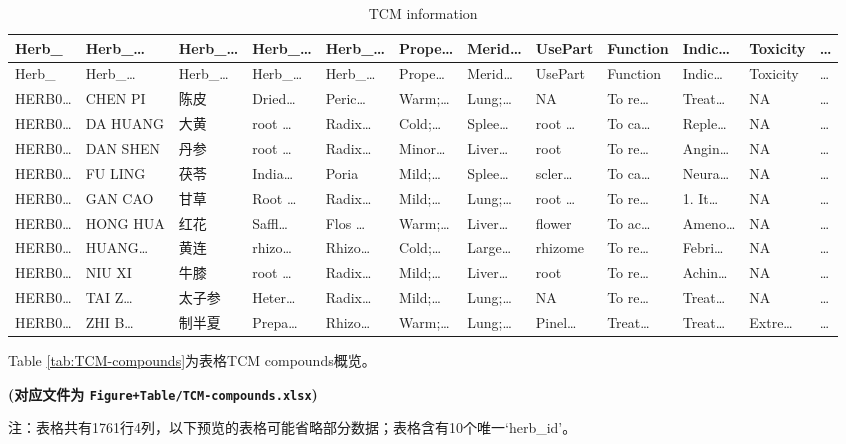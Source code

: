\documentclass[
]{article}
\begin{document}
\begin{longtable}[]{@{}llllllllllll@{}}
\caption{\label{tab:TCM-information}TCM information}\tabularnewline
\toprule
Herb\_ & Herb\_\ldots{} & Herb\_\ldots{} & Herb\_\ldots{} & Herb\_\ldots{} & Prope\ldots{} & Merid\ldots{} & UsePart & Function & Indic\ldots{} & Toxicity & \ldots{}\tabularnewline
\midrule
\endfirsthead
\toprule
Herb\_ & Herb\_\ldots{} & Herb\_\ldots{} & Herb\_\ldots{} & Herb\_\ldots{} & Prope\ldots{} & Merid\ldots{} & UsePart & Function & Indic\ldots{} & Toxicity & \ldots{}\tabularnewline
\midrule
\endhead
HERB0\ldots{} & CHEN PI & 陈皮 & Dried\ldots{} & Peric\ldots{} & Warm;\ldots{} & Lung;\ldots{} & NA & To re\ldots{} & Treat\ldots{} & NA & \ldots{}\tabularnewline
HERB0\ldots{} & DA HUANG & 大黄 & root \ldots{} & Radix\ldots{} & Cold;\ldots{} & Splee\ldots{} & root \ldots{} & To ca\ldots{} & Reple\ldots{} & NA & \ldots{}\tabularnewline
HERB0\ldots{} & DAN SHEN & 丹参 & root \ldots{} & Radix\ldots{} & Minor\ldots{} & Liver\ldots{} & root & To re\ldots{} & Angin\ldots{} & NA & \ldots{}\tabularnewline
HERB0\ldots{} & FU LING & 茯苓 & India\ldots{} & Poria & Mild;\ldots{} & Splee\ldots{} & scler\ldots{} & To ca\ldots{} & Neura\ldots{} & NA & \ldots{}\tabularnewline
HERB0\ldots{} & GAN CAO & 甘草 & Root \ldots{} & Radix\ldots{} & Mild;\ldots{} & Lung;\ldots{} & root \ldots{} & To re\ldots{} & 1. It\ldots{} & NA & \ldots{}\tabularnewline
HERB0\ldots{} & HONG HUA & 红花 & Saffl\ldots{} & Flos \ldots{} & Warm;\ldots{} & Liver\ldots{} & flower & To ac\ldots{} & Ameno\ldots{} & NA & \ldots{}\tabularnewline
HERB0\ldots{} & HUANG\ldots{} & 黄连 & rhizo\ldots{} & Rhizo\ldots{} & Cold;\ldots{} & Large\ldots{} & rhizome & To re\ldots{} & Febri\ldots{} & NA & \ldots{}\tabularnewline
HERB0\ldots{} & NIU XI & 牛膝 & root \ldots{} & Radix\ldots{} & Mild;\ldots{} & Liver\ldots{} & root & To re\ldots{} & Achin\ldots{} & NA & \ldots{}\tabularnewline
HERB0\ldots{} & TAI Z\ldots{} & 太子参 & Heter\ldots{} & Radix\ldots{} & Mild;\ldots{} & Lung;\ldots{} & NA & To re\ldots{} & Treat\ldots{} & NA & \ldots{}\tabularnewline
HERB0\ldots{} & ZHI B\ldots{} & 制半夏 & Prepa\ldots{} & Rhizo\ldots{} & Warm;\ldots{} & Lung;\ldots{} & Pinel\ldots{} & Treat\ldots{} & Treat\ldots{} & Extre\ldots{} & \ldots{}\tabularnewline
\bottomrule
\end{longtable}

Table \ref{tab:TCM-compounds}为表格TCM compounds概览。

\textbf{(对应文件为 \texttt{Figure+Table/TCM-compounds.xlsx})}

\begin{center}\begin{tcolorbox}[colback=gray!10, colframe=gray!50, width=0.9\linewidth, arc=1mm, boxrule=0.5pt]注：表格共有1761行4列，以下预览的表格可能省略部分数据；表格含有10个唯一`herb\_id'。
\end{tcolorbox}
\end{center}
\end{document}
